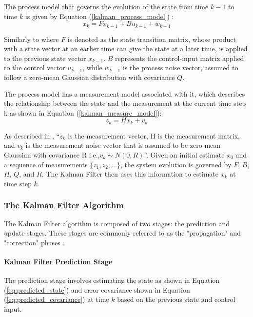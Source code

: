 The process model that governs the evolution of the state from time $k-1$ to time $k$ is given by Equation (\ref{kalman_process_model}) :
\begin{equation}
    x_k =Fx_{k-1}+Bu_{k-1} +w_{k-1}
    \label{kalman_process_model}
\end{equation}

Similarly to  \cite{Kim} where $F$ is denoted as the state transition matrix,  whose product with a state vector at an earlier time can give the state at a later time, is applied to the previous state vector $x_{k-1}$. $B$ represents the control-input matrix applied to the control vector $u_{k-1}$, while $w_{k-1}$ is the process noise vector, assumed to follow a zero-mean Gaussian distribution with covariance $Q$.

The process model has a measurement model associated with it, which describes the relationship between the state and the measurement at the current time step k as shown in Equation (\ref{kalman_measure_model}):
\begin{equation}
    z_k=Hx_k+v_k
    \label{kalman_measure_model}
\end{equation}

As described in \cite{Kim}, ``$z_k$ is the measurement vector, H is the measurement matrix, and $v_k$ is the measurement noise vector that is assumed to be zero-mean Gaussian with covariance R i.e.,$v_k \sim  \textit{N}(0,R)$''. Given an initial estimate $x_0$ and a sequence of measurements $\{z_1, z_2, \dots\}$, the system evolution is governed by $F$, $B$, $H$, $Q$, and $R$. The Kalman Filter then uses this information to estimate $x_k$ at time step $k$.


\subsubsection{The Kalman Filter Algorithm}
The Kalman Filter algorithm is composed of two stages: the prediction and update stages. These stages are commonly referred to as the "propagation" and "correction" phases \cite{Kim}.

\paragraph{Kalman Filter Prediction Stage}\mbox{}

The prediction stage involves estimating the state as shown in Equation (\ref{eq:predicted_state}) and error covariance shown in Equation (\ref{eq:predicted_covariance}) at time \( k \) based on the previous state and control input.

